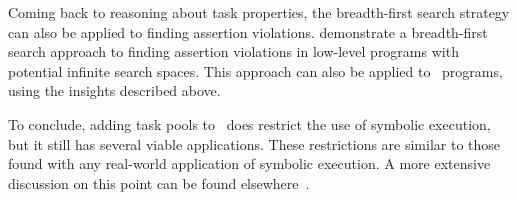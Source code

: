 Coming back to reasoning about task properties, the breadth-first search strategy can also be applied to finding assertion violations.
\citet{DBLP:conf/tap/NausVSR23} demonstrate a breadth-first search approach to finding assertion violations in low-level programs with potential infinite search spaces.
This approach can also be applied to \DYNTOPHAT\ programs, using the insights described above.

To conclude, adding task pools to \TOPHAT\ does restrict the use of symbolic execution, but it still has several viable applications.
These restrictions are similar to those found with any real-world application of symbolic execution.
A more extensive discussion on this point can be found elsewhere~\cite{conf/ifl/NausSK19}.